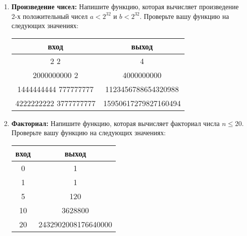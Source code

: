 \documentclass{article}
\begin{document}
\begin{enumerate}
\begin{enumerate}
\item \textbf{Произведение чисел:} Напишите функцию, которая вычисляет произведение 2-х положительный чисел $a < 2^{32}$ и $b < 2^{32}$. Проверьте вашу функцию на следующих значениях:
\begin{center}
\begin{tabular}{ c c }
 вход & выход \\ \hline
 2 2 & 4  \\ 
 2000000000 2 & 4000000000  \\ 
 1444444444 777777777 & 1123456788654320988 \\ 
 4222222222 3777777777 & 15950617279827160494 \\   
\end{tabular}
\end{center}
\item \textbf{Факториал:} Напишите функцию, которая вычисляет факториал числа $n \leq 20$. Проверьте вашу функцию на следующих значениях:
\begin{center}
\begin{tabular}{ c c }
 вход & выход \\ \hline
 0 & 1  \\ 
 1 & 1 \\  
 5 & 120   \\  
 10 & 3628800   \\  
 20 & 2432902008176640000   \\  
\end{tabular}
\end{center}


\end{enumerate}
\end{enumerate}
\end{document}

